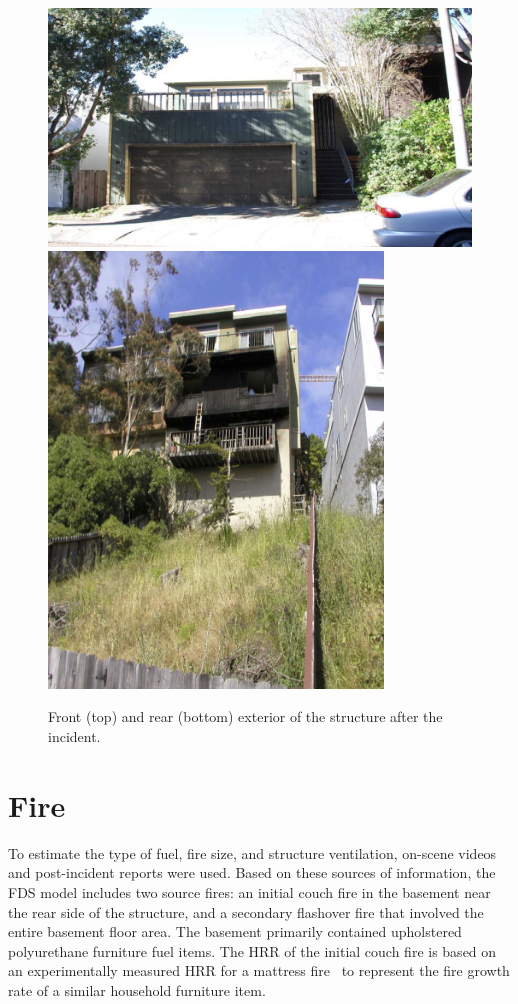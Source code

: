 \documentclass[12pt,oneside]{book}
\begin{document}
\begin{figure}[!ht]
\includegraphics[width=5.50in]{../Figures/Post_Exterior_Front} \\
\vspace{0.1in}
\includegraphics[width=3.50in]{../Figures/Post_Exterior_Rear}
\caption{Front (top) and rear (bottom) exterior of the structure after the incident.}
\label{fig:post_exterior}
\end{figure}

\section{Fire}
\label{sec:fire}

To estimate the type of fuel, fire size, and structure ventilation, on-scene videos and post-incident reports were used. Based on these sources of information, the FDS model includes two source fires: an initial couch fire in the basement near the rear side of the structure, and a secondary flashover fire that involved the entire basement floor area. The basement primarily contained upholstered polyurethane furniture fuel items. The HRR of the initial couch fire is based on an experimentally measured HRR for a mattress fire~\cite{madrzykowski2009fire} to represent the fire growth rate of a similar household furniture item.
\end{document}
